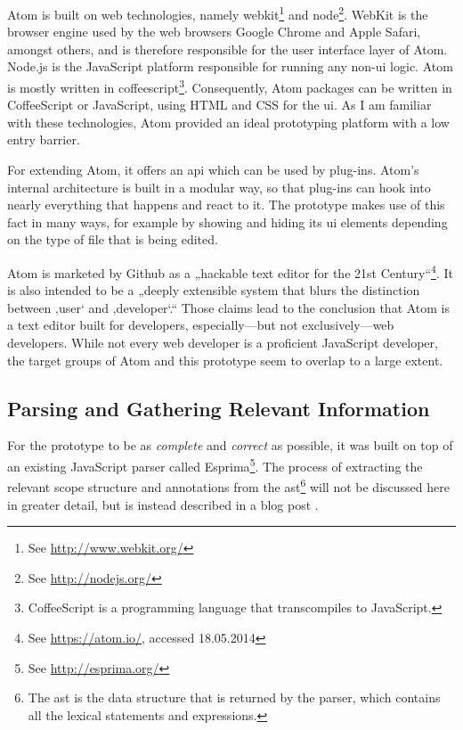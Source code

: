 Atom is built on web technologies, namely
\gls{webkit}\footnote{See \url{http://www.webkit.org/}} and
\gls{node}\footnote{See \url{http://nodejs.org/}}. WebKit is the browser
engine used by the web browsers Google Chrome and Apple Safari, amongst
others, and is therefore responsible for the user interface layer of
Atom. Node.js is the JavaScript platform responsible for running any
non-\ac{ui} logic. Atom is mostly written in
\gls{coffeescript}\footnote{CoffeeScript is a programming language that transcompiles to JavaScript.}.
Consequently, Atom packages can be written in CoffeeScript or
JavaScript, using HTML and CSS for the \ac{ui}. As I am familiar with
these technologies, Atom provided an ideal prototyping platform with a
low entry barrier.

For extending Atom, it offers an \ac{api} which can be used by plug-ins.
Atom’s internal architecture is built in a modular way, so that plug-ins
can hook into nearly everything that happens and react to it. The
prototype makes use of this fact in many ways, for example by showing
and hiding its \ac{ui} elements depending on the type of file that is
being edited.

Atom is marketed by Github as a „hackable text editor for the 21st
Century“\footnote{See \url{https://atom.io/}, accessed 18.05.2014}. It
is also intended to be a „deeply extensible system that blurs the
distinction between ‚user‘ and ‚developer‘.“ Those claims lead to the
conclusion that Atom is a text editor built for developers,
especially—but not exclusively—web developers. While not every web
developer is a proficient JavaScript developer, the target groups of
Atom and this prototype seem to overlap to a large extent.

\subsection{Parsing and Gathering Relevant
Information}\label{parsing-and-gathering-relevant-information}

For the prototype to be as \emph{complete} and \emph{correct} as
possible, it was built on top of an existing JavaScript parser called
Esprima\footnote{See \url{http://esprima.org/}}. The process of
extracting the relevant scope structure and annotations from the
\ac{ast}\footnote{The \ac{ast} is the data structure that is returned by the parser, which contains all the lexical statements and expressions.}
will not be discussed here in greater detail, but is instead described
in a blog post \cite{tvo}.

